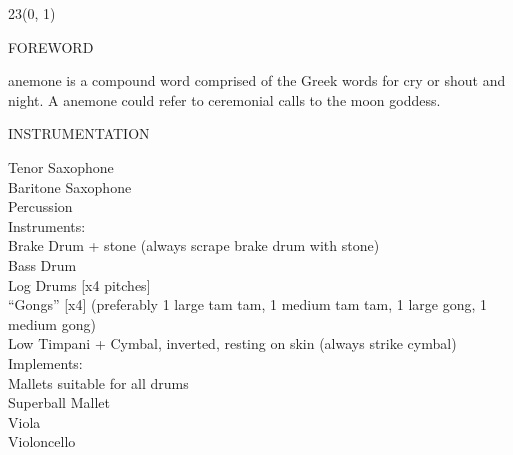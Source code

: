 \documentclass[11pt]{article}
\begin{document}
\begin{textblock}{23}(0, 1)
\begin{center}
\huge FOREWORD
\end{center}
\end{textblock}

\vspace*{0.25\baselineskip}

\begingroup

\begin{center}
anemone is a compound word comprised of the Greek words for cry or shout and night. A anemone could refer to ceremonial calls to the moon goddess.
\rightskip\leftskip
\phantom{text} \hfill \phantom{()}
\end{center}

\endgroup

\vspace*{5\baselineskip}

\begin{center}
\huge INSTRUMENTATION
\end{center}

\hspace*{1cm} Tenor Saxophone
\\
\hspace*{1cm} Baritone Saxophone
\\
\hspace*{1cm} Percussion
\\
\hspace*{2cm} Instruments:
\\
\hspace*{3cm} Brake Drum + stone (always scrape brake drum with stone)
\\
\hspace*{3cm} Bass Drum
\\
\hspace*{3cm} Log Drums [x4 pitches]
\\
\hspace*{3cm} ``Gongs'' [x4] (preferably 1 large tam tam, 1 medium tam tam, 1 large gong, 1 medium gong)
\\
\hspace*{3cm} Low Timpani + Cymbal, inverted, resting on skin (always strike cymbal)
\\
\hspace*{2cm} Implements:
\\
\hspace*{3cm} Mallets suitable for all drums
\\
\hspace*{3cm} Superball Mallet
\\
\hspace*{1cm} Viola
\\
\hspace*{1cm} Violoncello
\end{document}
